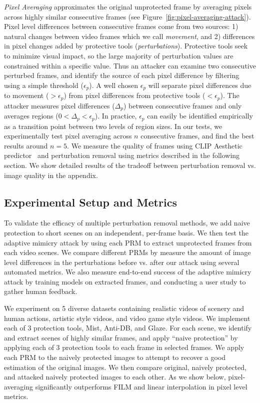 \emph{Pixel Averaging} approximates the original unprotected frame by
averaging pixels across highly similar consecutive frames (see
Figure~\ref{fig:pixel-averaging-attack}). Pixel level differences between
consecutive frames come from two sources: 1) natural changes between video
frames which we call \textit{movement}, and 2) differences in pixel changes
added by protective tools (\textit{perturbations}). Protective tools seek to
minimize visual impact, so the large majority of perturbation values are
constrained within a specific value. Thus an attacker can examine two
consecutive perturbed frames, and identify the source of each pixel
difference by filtering using a simple threshold ($\epsilon_p$). A well
chosen $\epsilon_p$ will separate pixel differences due to movement
($>\epsilon_p$) from pixel differences from protective tools
($<\epsilon_p$). The attacker measures pixel differences ($\Delta_p$) between
consecutive frames and only averages regions ($0 < \Delta_p <
\epsilon_p$). In practice, $\epsilon_p$ can easily be identified empirically
as a transition point between two levels of region sizes. In our tests, we
experimentally test pixel averaging across $n$ consecutive frames, and find
the best results around $n=5$.  We measure the quality of frames using CLIP
Aesthetic predictor~\cite{schuhmann2022laion} and perturbation removal using
metrics described in the following section. We show detailed results of the
tradeoff between perturbation removal vs. image quality in the appendix.

\subsection{Experimental Setup and Metrics}
To validate the efficacy of multiple perturbation removal methods, we add
naive protection to short scenes on an independent, per-frame basis. We then
test the adaptive mimicry attack by using each PRM to extract unprotected
frames from each video scenes. We compare different PRMs by measure the
amount of image level differences in the perturbations before vs. after our
attack using several automated metrics. We also measure end-to-end
success of the adaptive mimicry attack by training models on
extracted frames, and conducting a user study to gather human
feedback.

  We experiment on 5 diverse
datasets containing realistic videos of scenery and human actions, artistic
style videos, and video game style videos. We implement each of 3 protection
tools, Mist, Anti-DB, and Glaze.  For each scene, we identify and extract
scenes of highly similar frames, and apply ``naive protection'' by applying
each of 3 protection tools to each frame in selected frames. We apply each
PRM to the naively protected images to attempt to recover a good estimation
of the original images. We then compare original, naively protected, and
attacked naively protected images to each other.
As we show below, pixel-averaging significantly outperforms FILM and linear
interpolation in pixel level metrics.

